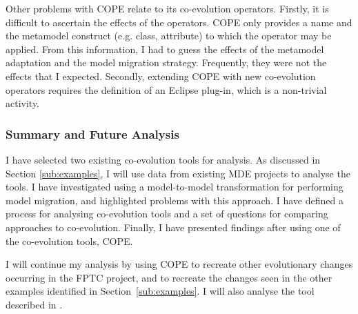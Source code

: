 Other problems with COPE relate to its co-evolution operators. Firstly, it is difficult to ascertain the effects of the operators. COPE only provides a name and the metamodel construct (e.g. class, attribute) to which the operator may be applied. From this information, I had to guess the effects of the metamodel adaptation and the model migration strategy. Frequently, they were not the effects that I expected. Secondly, extending COPE with new co-evolution operators requires the definition of an Eclipse plug-in, which is a non-trivial activity.

\subsubsection{Summary and Future Analysis}
I have selected two existing co-evolution tools for analysis. As discussed in Section \ref{sub:examples}, I will use data from existing MDE projects to analyse the tools. I have investigated using a model-to-model transformation for performing model migration, and highlighted problems with this approach. I have defined a process for analysing co-evolution tools and a set of questions for comparing approaches to co-evolution. Finally, I have presented findings after using one of the co-evolution tools, COPE.

I will continue my analysis by using COPE to recreate other evolutionary changes occurring in the FPTC project, and to recreate the changes seen in the other examples identified in Section~\ref{sub:examples}. I will also analyse the tool described in \cite{cicchetti08automating}.